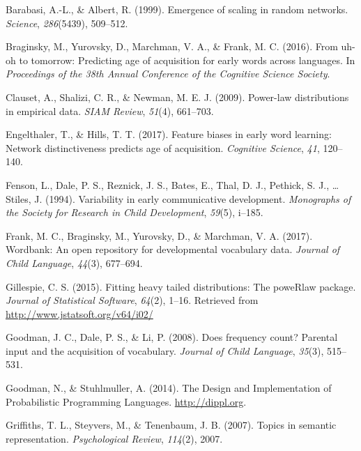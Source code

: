 \documentclass[english,floatsintext,man]{apa6}
\theoremstyle{definition}
\theoremstyle{definition}
\theoremstyle{definition}
\theoremstyle{remark}
\begin{document}
\setlength{\parindent}{-0.5in} \setlength{\leftskip}{0.5in}

\hypertarget{refs}{}
\hypertarget{ref-barabasi99}{}
Barabasi, A.-L., \& Albert, R. (1999). Emergence of scaling in random
networks. \emph{Science}, \emph{286}(5439), 509--512.

\hypertarget{ref-braginsky2016}{}
Braginsky, M., Yurovsky, D., Marchman, V. A., \& Frank, M. C. (2016).
From uh-oh to tomorrow: Predicting age of acquisition for early words
across languages. In \emph{Proceedings of the 38th Annual Conference of
the Cognitive Science Society}.

\hypertarget{ref-clauset09}{}
Clauset, A., Shalizi, C. R., \& Newman, M. E. J. (2009). Power-law
distributions in empirical data. \emph{SIAM Review}, \emph{51}(4),
661--703.

\hypertarget{ref-engelthaler2017}{}
Engelthaler, T., \& Hills, T. T. (2017). Feature biases in early word
learning: Network distinctiveness predicts age of acquisition.
\emph{Cognitive Science}, \emph{41}, 120--140.

\hypertarget{ref-fenson94}{}
Fenson, L., Dale, P. S., Reznick, J. S., Bates, E., Thal, D. J.,
Pethick, S. J., \ldots{} Stiles, J. (1994). Variability in early
communicative development. \emph{Monographs of the Society for Research
in Child Development}, \emph{59}(5), i--185.

\hypertarget{ref-frank2017}{}
Frank, M. C., Braginsky, M., Yurovsky, D., \& Marchman, V. A. (2017).
Wordbank: An open repository for developmental vocabulary data.
\emph{Journal of Child Language}, \emph{44}(3), 677--694.

\hypertarget{ref-gillespie15}{}
Gillespie, C. S. (2015). Fitting heavy tailed distributions: The
poweRlaw package. \emph{Journal of Statistical Software}, \emph{64}(2),
1--16. Retrieved from \url{http://www.jstatsoft.org/v64/i02/}

\hypertarget{ref-goodman2008}{}
Goodman, J. C., Dale, P. S., \& Li, P. (2008). Does frequency count?
Parental input and the acquisition of vocabulary. \emph{Journal of Child
Language}, \emph{35}(3), 515--531.

\hypertarget{ref-dippl}{}
Goodman, N., \& Stuhlmuller, A. (2014). The Design and Implementation of
Probabilistic Programming Languages. \url{http://dippl.org}.

\hypertarget{ref-griffiths07}{}
Griffiths, T. L., Steyvers, M., \& Tenenbaum, J. B. (2007). Topics in
semantic representation. \emph{Psychological Review}, \emph{114}(2),
2007.
\end{document}
